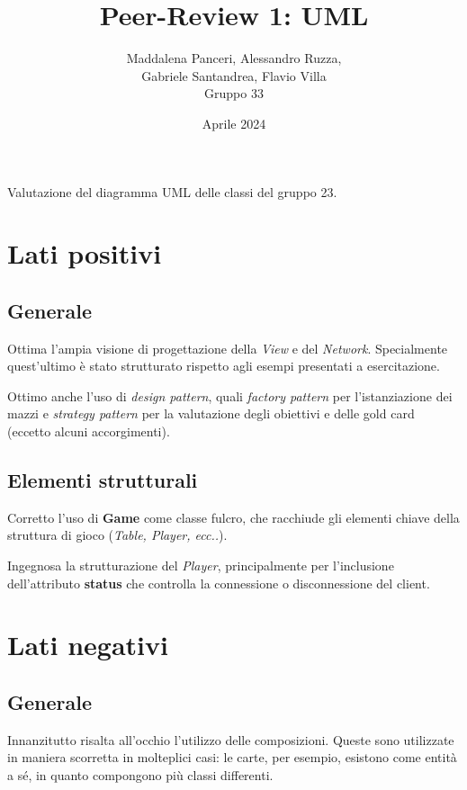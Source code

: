 \documentclass[12pt]{article}
\title{Peer-Review 1: UML}
\author{Maddalena Panceri, Alessandro Ruzza,\\ Gabriele Santandrea, Flavio Villa\\
Gruppo 33}
\date{Aprile 2024}
\begin{document}
\maketitle

\begin{center}
Valutazione del diagramma UML delle classi del gruppo 23.    
\end{center}

\section{Lati positivi}

\subsection{Generale}
Ottima l'ampia visione di progettazione della \textit{View} e del \textit{Network}. Specialmente quest'ultimo è stato strutturato rispetto agli esempi presentati a esercitazione.

Ottimo anche l'uso di \textit{design pattern}, quali \textit{factory pattern} per l'istanziazione dei mazzi e \textit{strategy pattern} per la valutazione degli obiettivi e delle gold card (eccetto alcuni accorgimenti).

\subsection{Elementi strutturali}

Corretto l'uso di \textbf{Game} come classe fulcro, che racchiude gli elementi chiave della struttura di gioco (\textit{Table, Player, ecc..}).

Ingegnosa la strutturazione del \textit{Player}, principalmente per l'inclusione dell'attributo \textbf{status} che controlla la connessione o disconnessione del client.

\section{Lati negativi}

\subsection{Generale}
Innanzitutto risalta all'occhio l'utilizzo delle composizioni. Queste sono utilizzate in maniera scorretta in molteplici casi: le carte, per esempio, esistono come entità a sé, in quanto compongono più classi differenti.
\end{document}
